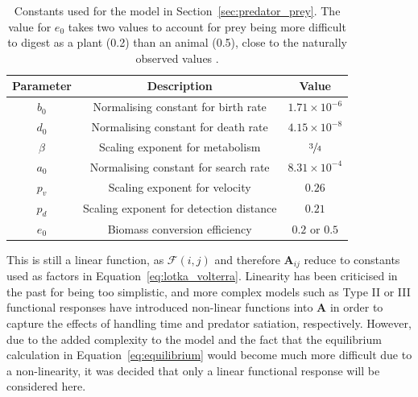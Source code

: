 \begin{table}
  \centering
  \caption[Values of constants used for the model in Section~\ref{sec:predator_prey}]{Constants used for the model in Section~\ref{sec:predator_prey}. The value for $e_0$ takes two values to account for prey being more difficult to digest as a plant (0.2) than an animal (0.5), close to the naturally observed values \cite{Lindeman1942, Kozlovsky1968}.}
  \setlength{\tabcolsep}{1em} %
  {\renewcommand{\arraystretch}{1.25}%
  \begin{tabular}{|c|c|c|}
    \hline
    Parameter & Description & Value
    \\\hline\hline
    $b_0$ & Normalising constant for birth rate & $1.71\times10^{-6}$
    \\\hline
    $d_0$ & Normalising constant for death rate & $4.15\times10^{-8}$
    \\\hline
    $\beta$ & Scaling exponent for metabolism & $\sfrac{3}{4}$
    \\\hline
    $a_0$ & Normalising constant for search rate & $8.31\times10^{-4}$
    \\\hline
    $p_v$ & Scaling exponent for velocity & $0.26$
    \\\hline
    $p_d$ & Scaling exponent for detection distance & $0.21$
    \\\hline
    $e_0$ & Biomass conversion efficiency & $0.2$ or $0.5$
    \\\hline
  \end{tabular}}
  \label{tab:lotka_volterra_constants}
\end{table}

This is still a linear function, as $\mathcal{F}(i,j)$ and therefore $\mathbf{A}_{ij}$ reduce to constants used as factors in Equation~\eqref{eq:lotka_volterra}. Linearity has been criticised in the past for being too simplistic, and more complex models such as Type II or III functional responses \cite{Holling1973} have introduced non-linear functions into $\mathbf{A}$ in order to capture the effects of handling time and predator satiation, respectively.
However, due to the added complexity to the model and the fact that the equilibrium calculation in Equation~\eqref{eq:equilibrium} would become much more difficult due to a non-linearity, it was decided that only a linear functional response will be considered here.

